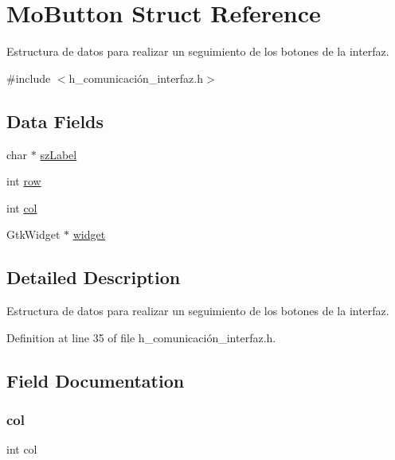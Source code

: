 \hypertarget{struct_mo_button}{}\section{Mo\+Button Struct Reference}
\label{struct_mo_button}


Estructura de datos para realizar un seguimiento de los botones de la interfaz.  




{\ttfamily \#include $<$h\+\_\+comunicación\+\_\+interfaz.\+h$>$}

\subsection*{Data Fields}
\begin{DoxyCompactItemize}
\item 
char $\ast$ \hyperlink{struct_mo_button_a7edf7c4d9e07404c9e94471a15615342}{sz\+Label}
\item 
int \hyperlink{struct_mo_button_af1d3cff2e4538e23400e260bae3dadad}{row}
\item 
int \hyperlink{struct_mo_button_afb52e720f5f0c483db5861f9e42e924e}{col}
\item 
Gtk\+Widget $\ast$ \hyperlink{struct_mo_button_aca344d357e68756eaeca7eca04111438}{widget}
\end{DoxyCompactItemize}


\subsection{Detailed Description}
Estructura de datos para realizar un seguimiento de los botones de la interfaz. 

Definition at line 35 of file h\+\_\+comunicación\+\_\+interfaz.\+h.



\subsection{Field Documentation}
\mbox{\label{struct_mo_button_afb52e720f5f0c483db5861f9e42e924e}} 
\subsubsection{\texorpdfstring{col}{col}}
{\footnotesize\ttfamily int col}



